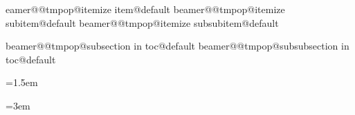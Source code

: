 
\makeatletter
\expandafter\let\csname beamer@@tmpop@itemize item@default\endcsname\relax
\expandafter\let\csname beamer@@tmpop@itemize subitem@default\endcsname\relax
\expandafter\let\csname beamer@@tmpop@itemize subsubitem@default\endcsname\relax


\patchcmd{\@listi}{\leftmargin}{\rightmargin}{}{}
\let\@listI\@listi
\patchcmd{\@listii}{\leftmargin}{\rightmargin}{}{}
\patchcmd{\@listiii}{\leftmargin}{\rightmargin}{}{}
\patchcmd{\beamer@enum@}{\raggedright}{\raggedleft}{}{}
\patchcmd{\@@description}{\raggedright}{\raggedleft}{}{}
\patchcmd{\@@description}{\leftmargin}{\rightmargin}{}{}

\renewcommand{\itemize}[1][]{
  \beamer@ifempty{#1}{}{\def\beamer@defaultospec{#1}}
  \ifnum \@itemdepth >2\relax\@toodeep\else
    \advance\@itemdepth\@ne
    \beamer@computepref\@itemdepth%
    \usebeamerfont{itemize/enumerate \beameritemnestingprefix body}%
    \usebeamercolor[fg]{itemize/enumerate \beameritemnestingprefix body}%
    \usebeamertemplate{itemize/enumerate \beameritemnestingprefix body begin}%
    \list{\usebeamertemplate{itemize \beameritemnestingprefix item}}{\def\makelabel##1{{
      \hss\llap{{
        \usebeamerfont*{itemize \beameritemnestingprefix item}
        \usebeamercolor[fg]{itemize \beameritemnestingprefix item}##1}}
      }}
    }
  \fi
  \beamer@cramped
  \raggedleft
  \beamer@firstlineitemizeunskip
}
\expandafter\let\csname beamer@@tmpop@subsection in toc@default\endcsname\relax
\expandafter\let\csname beamer@@tmpop@subsubsection in toc@default\endcsname\relax
{}
{\leavevmode\rightskip=1.5em\inserttocsubsection\par}

{\leavevmode\normalsize{}\rightskip=3em
  \inserttocsubsubsection\par}
\makeatother

